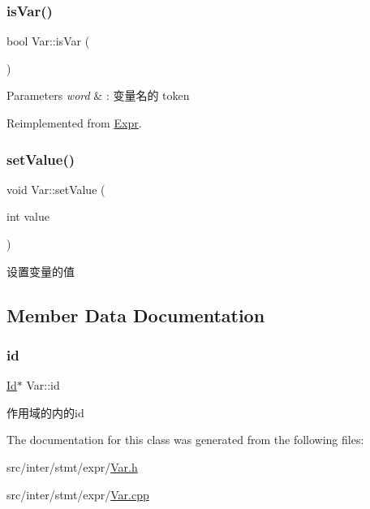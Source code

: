 \mbox{\label{class_var_a50aa6f54310903a8bc36184813a2b9ef}} 
\subsubsection{\texorpdfstring{is\+Var()}{isVar()}}
{\footnotesize\ttfamily bool Var\+::is\+Var (\begin{DoxyParamCaption}{ }\end{DoxyParamCaption})\hspace{0.3cm}{\ttfamily [virtual]}}


\begin{DoxyParams}{Parameters}
{\em word} & \+: 变量名的 token \\
\hline
\end{DoxyParams}


Reimplemented from \hyperlink{class_expr_add2b30644dd850c4bfa2d619d20d8c09}{Expr}.

\mbox{\label{class_var_af0f42d31f5001ff4d4781b9ba199a612}} 
\subsubsection{\texorpdfstring{set\+Value()}{setValue()}}
{\footnotesize\ttfamily void Var\+::set\+Value (\begin{DoxyParamCaption}\item[{int}]{value }\end{DoxyParamCaption})}



设置变量的值 



\subsection{Member Data Documentation}
\mbox{\label{class_var_a3e5c7c9425da4659290da5c0553c7dc6}} 
\subsubsection{\texorpdfstring{id}{id}}
{\footnotesize\ttfamily \hyperlink{class_id}{Id}$\ast$ Var\+::id}

作用域的内的id 

The documentation for this class was generated from the following files\+:\begin{DoxyCompactItemize}
\item 
src/inter/stmt/expr/\hyperlink{_var_8h}{Var.\+h}\item 
src/inter/stmt/expr/\hyperlink{_var_8cpp}{Var.\+cpp}\end{DoxyCompactItemize}
